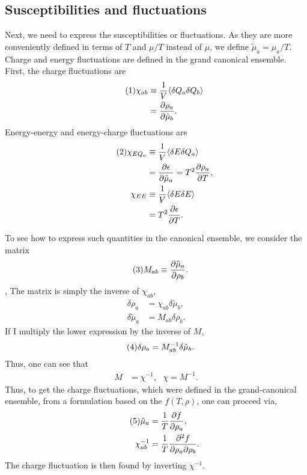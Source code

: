 \documentclass[12pt]{article}
\numberwithin{equation}{section}
\numberwithin{figure}{section}
\newcommand\eqnumber{\addtocounter{equation}{1}\tag{\theequation}}
\begin{document}
\subsection{Susceptibilities and fluctuations}

Next, we need to express the susceptibilities or fluctuations. As they are more conveniently defined in terms of $T$ and $\mu/T$ instead of $\mu$, we define $\tilde{\mu}_a=\mu_a/T$. Charge and energy fluctuations are defined in the grand canonical ensemble. First, the charge fluctuations are
\begin{align*}\eqnumber
\chi_{ab}&\equiv\frac{1}{V}\langle\delta Q_a\delta Q_b\rangle\\
&=\frac{\partial\rho_a}{\partial\tilde{\mu}_b}.
\end{align*}
Energy-energy and energy-charge fluctuations are
\begin{align*}\eqnumber
\chi_{EQ_a}&\equiv\frac{1}{V}\langle\delta E\delta Q_a\rangle\\
&=\frac{\partial\epsilon}{\partial\tilde{\mu}_a}=T^2\frac{\partial\rho_a}{\partial T},\\
\chi_{EE}&\equiv\frac{1}{V}\langle\delta E\delta E\rangle\\
&=T^2\frac{\partial\epsilon}{\partial T}.
\end{align*}

To see how to express such quantities in the canonical ensemble, we consider the matrix
\begin{align*}\eqnumber
M_{ab}&\equiv\frac{\partial\tilde{\mu}_a}{\partial\rho_b}.
\end{align*},
The matrix is simply the inverse of $\chi_{ab}$,
\begin{align*}
\delta\rho_a&=\chi_{ab}\delta\tilde{\mu}_b,\\
\delta\tilde{\mu}_a&=M_{ab}\delta\rho_b.
\end{align*}
If I multiply the lower expression by the inverse of $M$,
\begin{align*}\eqnumber
\delta\rho_a&=M^{-1}_{ab}\delta\tilde{\mu}_b.
\end{align*}
Thus, one can see that
\begin{align*}
M&=\chi^{-1},~~~\chi=M^{-1}.
\end{align*}
Thus, to get the charge fluctuations, which were defined in the grand-canonical ensemble,  from a formulation based on the $f(T,\rho)$, one can proceed via,
\begin{align*}\eqnumber
\tilde{\mu}_a&=\frac{1}{T}\frac{\partial f}{\partial\rho_a},\\
\chi^{-1}_{ab}&=\frac{1}{T}\frac{\partial^2 f}{\partial\rho_a\partial\rho_b}.
\end{align*}
The charge fluctuation is then found by inverting $\chi^{-1}$.
\end{document}
